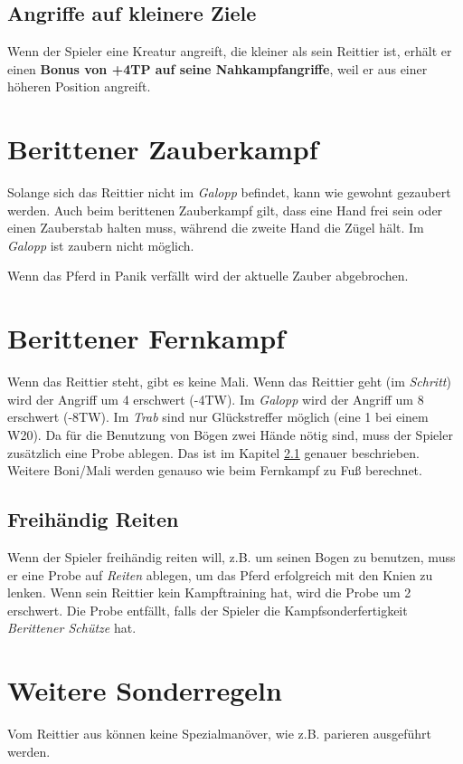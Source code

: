 \subsection{Angriffe auf kleinere Ziele}
Wenn der Spieler eine Kreatur angreift, die kleiner als sein Reittier ist, erhält er einen \textbf{Bonus von +4TP auf seine Nahkampfangriffe}, weil er aus einer höheren Position angreift.


\section{Berittener Zauberkampf}
Solange sich das Reittier nicht im \textit{Galopp} befindet, kann wie gewohnt gezaubert werden. Auch beim berittenen Zauberkampf gilt, dass eine Hand frei sein oder einen Zauberstab halten muss, während die zweite Hand die Zügel hält. Im \textit{Galopp} ist zaubern nicht möglich.

Wenn das Pferd in Panik verfällt wird der aktuelle Zauber abgebrochen.


\section{Berittener Fernkampf}
\label{chap:berittener_fernkampf}
Wenn das Reittier steht, gibt es keine Mali. Wenn das Reittier geht (im \textit{Schritt}) wird der Angriff um 4 erschwert (-4TW). Im \textit{Galopp} wird der Angriff um 8 erschwert (-8TW). Im \textit{Trab} sind nur Glückstreffer möglich (eine 1 bei einem W20). Da für die Benutzung von Bögen zwei Hände nötig sind, muss der Spieler zusätzlich eine Probe ablegen. Das ist im Kapitel \ref{chap:freihaendig_reiten} genauer beschrieben. Weitere Boni/Mali werden genauso wie beim Fernkampf zu Fuß berechnet.

\subsection{Freihändig Reiten} 
\label{chap:freihaendig_reiten}
Wenn der Spieler freihändig reiten will, z.B. um seinen Bogen zu benutzen, muss er eine Probe auf \textit{Reiten} ablegen, um das Pferd erfolgreich mit den Knien zu lenken. Wenn sein Reittier kein Kampftraining hat, wird die Probe um 2 erschwert. Die Probe entfällt, falls der Spieler die Kampfsonderfertigkeit \textit{Berittener Schütze} hat.

\section{Weitere Sonderregeln}
Vom Reittier aus können keine Spezialmanöver, wie z.B. parieren ausgeführt werden.

